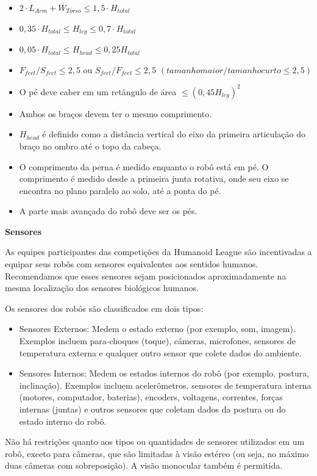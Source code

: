 \begin{itemize}
\item $2 \cdot L_{Arm} + W_{Torso} \leq 1,5 \cdot H_{total}$
\item $0,35 \cdot H_{total} \leq H_{leg} \leq 0,7 \cdot H_{total}$
\item $0,05 \cdot H_{total} \leq H_{head} \leq 0,25 H_{total}$
\item $F_{feet} / S_{feet} \leq 2,5$ ou $S_{feet} / F_{feet} \leq 2,5$ $(tamanho maior / tamanho curto \leq 2,5)$
\item O pé deve caber em um retângulo de área $\leq (0,45 H_{leg})^2$
\item Ambos os braços devem ter o mesmo comprimento.
\item $H_{head}$ é definido como a distância vertical do eixo da primeira articulação do braço no ombro até o topo da cabeça.
\item O comprimento da perna é medido enquanto o robô está em pé. O comprimento é medido desde a primeira junta rotativa, onde seu eixo se encontra no plano paralelo ao solo, até a ponta do pé.
\item A parte mais avançada do robô deve ser os pés.
\end{itemize}


{\bfseries Sensores}

\headlinebox

As equipes participantes das competições da Humanoid League são incentivadas a equipar seus robôs com sensores equivalentes aos sentidos humanos. Recomendamos que esses sensores sejam posicionados aproximadamente na mesma localização dos sensores biológicos humanos.

Os sensores dos robôs são classificados em dois tipos:
\begin{itemize}
\item Sensores Externos: Medem o estado externo (por exemplo, som, imagem). Exemplos incluem para-choques (toque), câmeras, microfones, sensores de temperatura externa e qualquer outro sensor que colete dados do ambiente.
\item Sensores Internos: Medem os estados internos do robô (por exemplo, postura, inclinação). Exemplos incluem acelerômetros, sensores de temperatura interna (motores, computador, baterias), encoders, voltagens, correntes, forças internas (juntas) e outros sensores que coletam dados da postura ou do estado interno do robô.
\end{itemize}

Não há restrições quanto aos tipos ou quantidades de sensores utilizados em um robô, exceto para câmeras, que são limitadas à visão estéreo (ou seja, no máximo duas câmeras com sobreposição). A visão monocular também é permitida.

